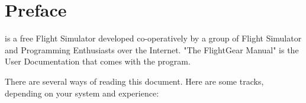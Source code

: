 
\chapter{Preface}
\label{preface}

\FlightGear{} is a free Flight Simulator developed co-operatively by a group of Flight
Simulator and Programming Enthusiasts over the Internet. "The
FlightGear Manual" is the User Documentation that comes with the
program.

There are several ways of reading this document. Here are some tracks, depending on your
system and experience:







